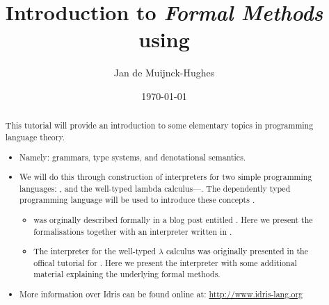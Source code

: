 


\newcommand{\version}{\gitVtagn}

\title{Introduction to \emph{Formal Methods} using \idris{}}
\author{Jan de Muijnck-Hughes}
\date{\origdate\today}



\maketitle%
\begin{abstract}
This tutorial will provide an introduction to some elementary topics in programming language theory.

\begin{itemize}
\item Namely: grammars, type systems, and denotational semantics.
\item We will do this through construction of interpreters for two simple programming languages: \allang{}, and the well-typed lambda calculus---\lamlang{}.
The dependently typed programming language \idris{} will be used to introduce these concepts \cite{}.
\begin{itemize}
\item \allang{} was orginally described formally in a blog post entitled .
Here we present the formalisations together with an interpreter written in \idris{}.

\item The interpreter for the well-typed $\lambda$ calculus was originally presented in the offical tutorial for \idris{} \cite{Community2014}.
Here we present the interpreter with some additional material explaining the underlying formal methods.
\end{itemize}
\item More information over Idris can be found online at: \url{http://www.idris-lang.org}
\end{itemize}
\end{abstract}

\newpage
\tableofcontents
\newpage





%





%

%
% 
%

\newpage
\printbibliography{}


